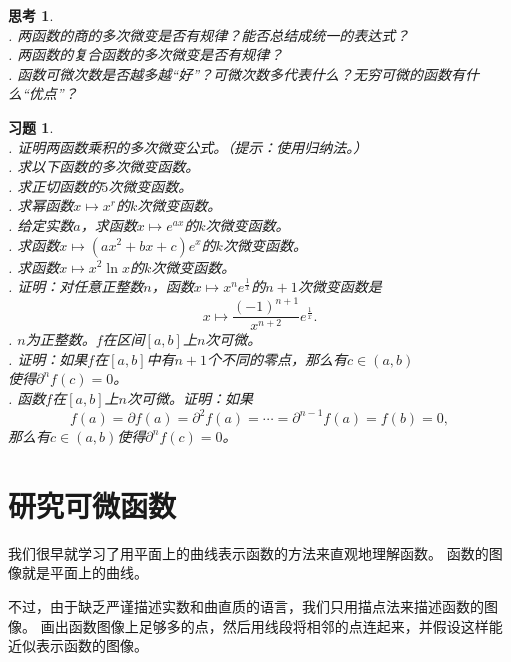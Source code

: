 \documentclass[12pt,UTF8]{ctexbook}
\newtheorem{sk}{思考}[section]
\newtheorem{xt}{习题}[section]
\begin{document}
\begin{sk}
    \mbox{} \\
    . 两函数的商的多次微变是否有规律？能否总结成统一的表达式？\\
    . 两函数的复合函数的多次微变是否有规律？\\
    . 函数可微次数是否越多越“好”？可微次数多代表什么？无穷可微的函数有什么“优点”？
\end{sk}

\begin{xt}
    \mbox{} \\
    . 证明两函数乘积的多次微变公式。（提示：使用归纳法。）\\
    . 求以下函数的多次微变函数。\\
    . 求正切函数的$5$次微变函数。\\
    . 求幂函数$x\mapsto x^r$的$k$次微变函数。\\
    . 给定实数$a$，求函数$x\mapsto e^{ax}$的$k$次微变函数。\\
    . 求函数$x \mapsto (ax^2 + bx + c)e^x$的$k$次微变函数。\\
    . 求函数$x \mapsto x^2\ln{x}$的$k$次微变函数。\\
    . 证明：对任意正整数$n$，函数$x\mapsto x^n e^{\frac{1}{x}}$的$n+1$次微变函数是
    $$x\mapsto \frac{(-1)^{n+1}}{x^{n+2}}e^{\frac{1}{x}}.$$
    . $n$为正整数。$f$在区间$[a, b]$上$n$次可微。\\
    . 证明：如果$f$在$[a, b]$中有$n+1$个不同的零点，那么有$c\in(a, b)$\\
    \indent 使得$\partial^n f(c) = 0$。\\
    . 函数$f$在$[a, b]$上$n$次可微。证明：如果
    $$f(a) = \partial f(a) = \partial^2 f(a) = \cdots = \partial^{n-1} f(a) = f(b) = 0,$$
    \indent 那么有$c\in(a, b)$使得$\partial^n f(c) = 0$。\\
\end{xt}

\chapter{研究可微函数}

我们很早就学习了用平面上的曲线表示函数的方法来直观地理解函数。
函数的图像就是平面上的曲线。

不过，由于缺乏严谨描述实数和曲直质的语言，我们只用描点法来描述函数的图像。
画出函数图像上足够多的点，然后用线段将相邻的点连起来，并假设这样能近似表示函数的图像。
\end{document}
